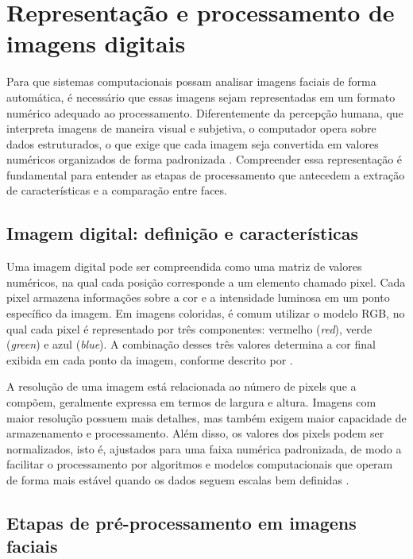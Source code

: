 \section{Representação e processamento de imagens digitais}

Para que sistemas computacionais possam analisar imagens faciais de forma automática, é necessário que essas imagens sejam representadas em um formato numérico adequado ao processamento. Diferentemente da percepção humana, que interpreta imagens de maneira visual e subjetiva, o computador opera sobre dados estruturados, o que exige que cada imagem seja convertida em valores numéricos organizados de forma padronizada \cite{marques1999pdi}. Compreender essa representação é fundamental para entender as etapas de processamento que antecedem a extração de características e a comparação entre faces.

\subsection{Imagem digital: definição e características}

Uma imagem digital pode ser compreendida como uma matriz de valores numéricos, na qual cada posição corresponde a um elemento chamado pixel. Cada pixel armazena informações sobre a cor e a intensidade luminosa em um ponto específico da imagem. Em imagens coloridas, é comum utilizar o modelo \acs{RGB}, no qual cada pixel é representado por três componentes: vermelho (\textit{red}), verde (\textit{green}) e azul (\textit{blue}). A combinação desses três valores determina a cor final exibida em cada ponto da imagem, conforme descrito por \textcite{gonzalez2018dip}.

A resolução de uma imagem está relacionada ao número de pixels que a compõem, geralmente expressa em termos de largura e altura. Imagens com maior resolução possuem mais detalhes, mas também exigem maior capacidade de armazenamento e processamento. Além disso, os valores dos pixels podem ser normalizados, isto é, ajustados para uma faixa numérica padronizada, de modo a facilitar o processamento por algoritmos e modelos computacionais que operam de forma mais estável quando os dados seguem escalas bem definidas \cite{gonzalez2018dip}.

\subsection{Etapas de pré-processamento em imagens faciais}

